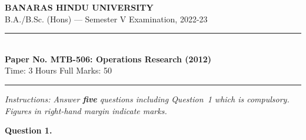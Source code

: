 \documentclass[11pt,a4paper]{article}
\begin{document}
\begin{center}
  {\large\bfseries BANARAS HINDU UNIVERSITY}\\[2pt]
  {\normalsize B.A./B.Sc. (Hons) --- Semester V Examination, 2022-23}\\[6pt]
  \rule{0.8\linewidth}{0.5pt}\\[6pt]
  {\large\bfseries Paper No. MTB-506: Operations Research (2012)}\\[4pt]
  {\normalsize Time: 3 Hours \hfill Full Marks: 50}
\end{center}
\rule{\linewidth}{0.4pt}
\smallskip



\noindent   \textit{Instructions: Answer   \textbf{five} questions including Question~1 which is compulsory. Figures in right-hand margin indicate marks.}
\bigskip




\noindent   \textbf{Question 1.}
\end{document}
